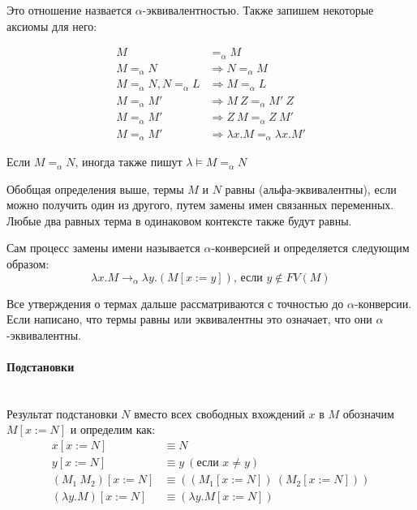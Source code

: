 \documentclass[lambda.tex]{subfiles}
\begin{document}
Это отношение назвается $\alpha$-эквивалентностью. Также запишем некоторые аксиомы для него:

\begin{align*}
	M &=_\alpha M\\
	M =_\alpha N &\Rightarrow N =_\alpha M\\
	M =_\alpha N, N =_\alpha L &\Rightarrow M =_\alpha L\\
	M =_\alpha M' &\Rightarrow M\ Z =_\alpha M'\ Z\\
	M =_\alpha M' &\Rightarrow Z\ M =_\alpha Z\ M'\\
	M =_\alpha M' &\Rightarrow \lambda x.M =_\alpha \lambda x.M'
\end{align*}

Если $M =_\alpha N$, иногда также пишут $\lambda\models M =_\alpha N$


Обобщая определения выше, термы $M$ и $N$ равны (альфа-эквивалентны), если можно получить один из другого, путем замены имен связанных переменных. Любые два равных терма в одинаковом контексте также будут равны.

Сам процесс замены имени называется $\alpha$-конверсией и определяется следующим образом:
\begin{equation*}
	\lambda x.M \rightarrow_\alpha \lambda y.(M[x := y]) \text {, если } y \not\in FV(M)\tag{$\alpha$}
\end{equation*}

Все утверждения о термах дальше рассматриваются с точностью до $\alpha$-конверсии. Если написано, что термы равны или эквивалентны это означает, что они $\alpha$-эквивалентны.

\newpage
\paragraph{Подстановки} %
\label{par:substitution}~\\

Результат подстановки $N$ вместо всех свободных вхождений $x$ в $M$ обозначим $M[x := N]$ и определим как:
\begin{align*}
	x[x := N] &\equiv N\\
	y[x := N] &\equiv y\ (\text{если } x \neq y)\\
	(M_1 \ M_2 )[x := N] &\equiv ((M_1 [x := N])\ (M_2 [x := N]))\\
	(\lambda y.M)[x := N] &\equiv (\lambda y.M[x := N])
\end{align*}
\end{document}
